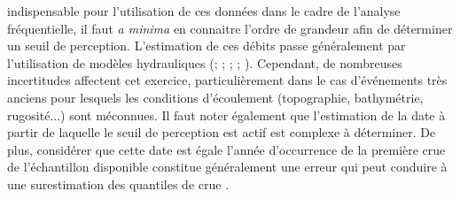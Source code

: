 \documentclass[11pt]{article}
\begin{document}
indispensable pour l'utilisation de ces données dans le cadre de l'analyse fréquentielle, il faut \textit{a minima} en connaitre l'ordre de grandeur afin de déterminer un seuil de perception. L'estimation de ces débits passe généralement par l'utilisation de modèles hydrauliques (\cite{naulet_flood_2005}; \cite{neppel_flood_2010}; \cite{wetter_largest_2011}; \cite{machado_flood_2015}; \cite{ruiz-bellet_uncertainty_2017}). Cependant, de nombreuses incertitudes affectent cet exercice, particulièrement dans le cas d'événements très anciens pour lesquels les conditions d'écoulement (topographie, bathymétrie, rugosité...) sont méconnues. Il faut noter également que l'estimation de la date à partir de laquelle le seuil de perception est actif est complexe à déterminer. De plus, considérer que cette date est égale l'année d'occurrence de la première crue de l'échantillon disponible constitue généralement une erreur qui peut conduire à une surestimation des quantiles de crue \citep{prosdocimi_german_2018}.

%
%
\end{document}
